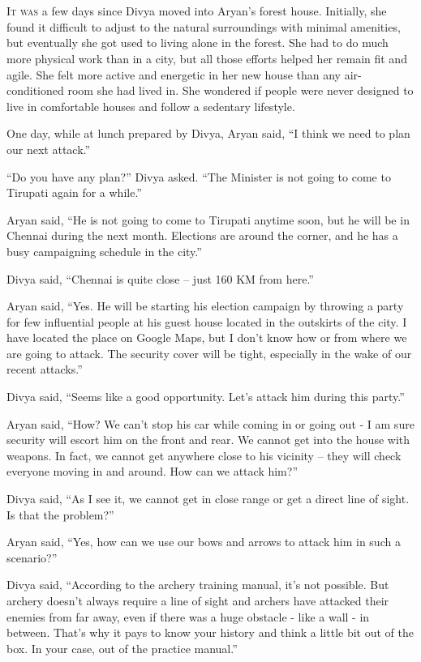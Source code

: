 \chapter{}

\lettrine{I}{t was} a few days since Divya moved into Aryan's forest house. Initially, she
found it difficult to adjust to the natural surroundings with minimal amenities,
but eventually she got used to living alone in the forest. She had to do much
more physical work than in a city, but all those efforts helped her remain fit
and agile. She felt more active and energetic in her new house than any
air-conditioned room she had lived in. She wondered if people were never
designed to
live in comfortable houses and follow a sedentary lifestyle.

One day, while at lunch prepared by Divya, Aryan said, “I think we need to plan
our next attack.”

“Do you have any plan?” Divya asked. “The Minister is not going to come to
Tirupati again for a while.”

Aryan said, “He is not going to come to Tirupati anytime soon, but he will be in
Chennai during the next month. Elections are around the corner, and he has a busy
campaigning schedule in the city.”

Divya said, “Chennai is quite close – just 160 KM from here.”

Aryan said, “Yes. He will be starting his election campaign by throwing a party
for few influential people at his guest house located in the outskirts of the
city. I have located the place on Google Maps, but I don't know how or from
where we are going to attack. The security cover will be tight, especially in
the wake of our recent attacks.”

Divya said, “Seems like a good opportunity. Let's attack him during this party.”

Aryan said, “How? We can't stop his car while coming in or going out - I am sure
security will escort him on the front and rear. We cannot get into the house
with weapons. In fact, we cannot get anywhere close to his vicinity – they will
check everyone moving in and around. How can we attack him?”

Divya said, “As I see it, we cannot get in close range or get a direct line of
sight. Is that the problem?”

Aryan said, “Yes, how can we use our bows and arrows to attack him in such a
scenario?”

Divya said, “According to the archery training manual, it's not possible. But
archery doesn't always require a line of sight and archers have attacked their
enemies from far away, even if there was a huge obstacle - like a wall - in
between. That's why it pays to know your history and think a little bit out of
the box. In your case, out of the practice manual.”

